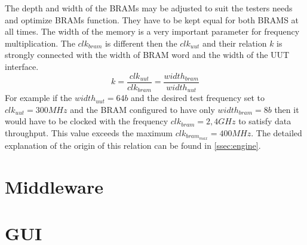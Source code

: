 The depth and width of the BRAMs may be adjusted to suit the testers needs and optimize BRAMs function. They have to be kept equal for both BRAMS at all times. The width of the memory is a very important parameter for frequency multiplication. The $clk_{bram}$ is different then the $clk_{uut}$ and their relation $k$ is strongly connected with the width of BRAM word and the width of the UUT interface.
\begin{equation}
k = \frac{clk_{uut}}{clk_{bram}} = \frac{width_{bram}}{width_{uut}}
\end{equation}
For example if the $width_{uut} = 64b$ and the desired test frequency set to $clk_{uut} = 300MHz$ and the BRAM configured to have only $width_{bram} = 8b$ then it would have to be clocked with the frequency $clk_{bram} = 2,4GHz$ to satisfy data throughput. This value exceeds the maximum $clk_{bram_{max}} = 400MHz$. The detailed explanation of the origin of this relation can be found in \autoref{ssec:engine}.


\section{Middleware}
\section{GUI}